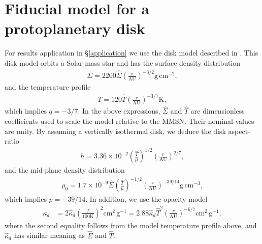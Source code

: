 \section{Fiducial model for a protoplanetary disk}\label{mmsn}
For results application in \S\ref{application} we use the disk model
described in \cite{chiang10}. This disk model orbits a Solar-mass star and 
has the surface density distribution
\begin{align}\label{mmsn_sigma}
  \Sigma = 2200
  \hat{\Sigma}\left(\frac{r}{\mathrm{AU}}\right)^{-3/2}\mathrm{g}\,\mathrm{cm}^{-2},  
\end{align}
and the temperature profile
\begin{align}\label{mmsn_temp}
  T = 120\hat{T}\left(\frac{r}{\mathrm{AU}}\right)^{-3/7} \mathrm{K},
\end{align}
which implies $q=-3/7$. In the above expressions, $\hat{\Sigma}$ and
$\hat{T}$ are dimensionless coefficients used to scale the model
relative to the MMSN. Their nominal values are unity. By assuming a
vertically isothermal disk, we deduce the disk aspect-ratio 
\begin{align}\label{mmsn_epsilon}
  h =
  3.36\times10^{-2}\left(\frac{\hat{T}}{\mu}\right)^{1/2}\left(\frac{r}{\mathrm{AU}}\right)^{2/7}, 
\end{align}
and the mid-plane density distribution 
\begin{align}
\rho_0 = 1.7\times10^{-9}
  \hat{\Sigma}\left(\frac{\hat{T}}{\mu}\right)^{-1/2}\left(\frac{r}{\mathrm{AU}}\right)^{-39/14}\mathrm{g}\,\mathrm{cm}^{-3},
\end{align}
which implies $p=-39/14$. 
In addition, we use the opacity model
 \begin{align}
   \kappa_d &= 2 \hat{\kappa}_d \left(\frac{T}{100\mathrm{K}}\right)^2
   \mathrm{cm}^2\,\mathrm{g}^{-1}
    =
   2.88\hat{\kappa}_d\hat{T}^2\left(\frac{r}{\mathrm{AU}}\right)^{-6/7}\mathrm{cm}^2\,\mathrm{g}^{-1},   
 \end{align}
\citep{bell94} where the second equality follows from the model
temperature profile above, and $\hat{\kappa}_d$ has similar meaning as
$\hat{\Sigma}$ and $\hat{T}$.  
